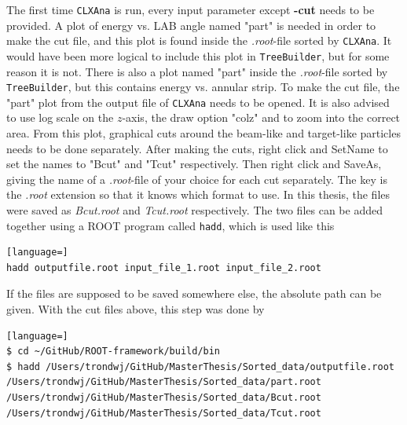 \documentclass[twoside,english]{uiofysmaster/uiofysmaster}
\begin{document}
The first time \texttt{CLXAna} is run, every input parameter except \textbf{-cut} needs to be provided. 
A plot of energy vs. LAB angle named "part" is needed in order to make the cut file, and this plot is found inside the \textit{.root}-file sorted by \texttt{CLXAna}.
It would have been more logical to include this plot in \texttt{TreeBuilder}, but for some reason it is not. 
There is also a plot named "part" inside the \textit{.root}-file sorted by \texttt{TreeBuilder}, but this contains energy vs. annular strip.
To make the cut file, the "part" plot from the output file of \texttt{CLXAna} needs to be opened.
It is also advised to use log scale on the $z$-axis, the draw option "colz" and to zoom into the correct area.
From this plot, graphical cuts around the beam-like and target-like particles needs to be done separately. 
After making the cuts, right click and SetName to set the names to "Bcut" and "Tcut" respectively. 
Then right click and SaveAs, giving the name of a \textit{.root}-file of your choice for each cut separately. 
The key is the \textit{.root} extension so that it knows which format to use. 
In this thesis, the files were saved as \textit{Bcut.root} and \textit{Tcut.root} respectively.
The two files can be added together using a ROOT program called \texttt{hadd}, which is used like this
\begin{lstlisting}[language=]
hadd outputfile.root input_file_1.root input_file_2.root 
\end{lstlisting}
If the files are supposed to be saved somewhere else, the absolute path can be given.
With the cut files above, this step was done by
\begin{lstlisting}[language=]
$ cd ~/GitHub/ROOT-framework/build/bin
$ hadd /Users/trondwj/GitHub/MasterThesis/Sorted_data/outputfile.root /Users/trondwj/GitHub/MasterThesis/Sorted_data/part.root /Users/trondwj/GitHub/MasterThesis/Sorted_data/Bcut.root /Users/trondwj/GitHub/MasterThesis/Sorted_data/Tcut.root 
\end{lstlisting}
\end{document}
